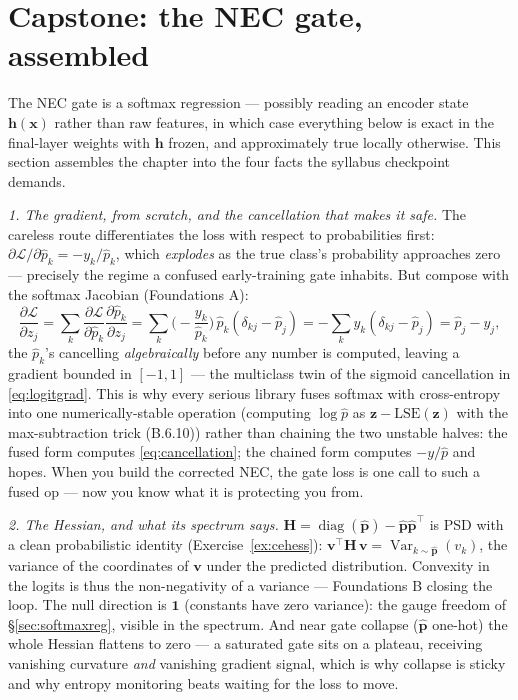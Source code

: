 \documentclass[11pt]{article}
\numberwithin{equation}{section}
\theoremstyle{plain}
\theoremstyle{definition}
\theoremstyle{remark}
\DeclareMathOperator{\Var}{Var}
\DeclareMathOperator{\diag}{diag}
\newcommand{\x}{\bm{x}}
\newcommand{\T}{\top}
\begin{document}
\section{Capstone: the NEC gate, assembled}\label{sec:gate}

The NEC gate is a softmax regression --- possibly reading an encoder state $\bm{h}(\x)$ rather than raw features, in which case everything below is exact in the final-layer weights with $\bm{h}$ frozen, and approximately true locally otherwise. This section assembles the chapter into the four facts the syllabus checkpoint demands.

\emph{1. The gradient, from scratch, and the cancellation that makes it safe.} The careless route differentiates the loss with respect to probabilities first: $\partial \mathcal{L} / \partial \hat p_k = -y_k / \hat p_k$, which \emph{explodes} as the true class's probability approaches zero --- precisely the regime a confused early-training gate inhabits. But compose with the softmax Jacobian (Foundations A):
\begin{equation}
\frac{\partial \mathcal{L}}{\partial z_j}
= \sum_k \frac{\partial \mathcal{L}}{\partial \hat p_k} \frac{\partial \hat p_k}{\partial z_j}
= \sum_k \Big(\!-\frac{y_k}{\hat p_k}\Big)\, \hat p_k (\delta_{kj} - \hat p_j)
= -\sum_k y_k (\delta_{kj} - \hat p_j)
= \hat p_j - y_j ,
\label{eq:cancellation}
\end{equation}
the $\hat p_k$'s cancelling \emph{algebraically} before any number is computed, leaving a gradient bounded in $[-1, 1]$ --- the multiclass twin of the sigmoid cancellation in \eqref{eq:logitgrad}. This is why every serious library fuses softmax with cross-entropy into one numerically-stable operation (computing $\log \hat p$ as $\bm{z} - \mathrm{LSE}(\bm z)$ with the max-subtraction trick (B.6.10)) rather than chaining the two unstable halves: the fused form computes \eqref{eq:cancellation}; the chained form computes $-y/\hat p$ and hopes. When you build the corrected NEC, the gate loss is one call to such a fused op --- now you know what it is protecting you from.

\emph{2. The Hessian, and what its spectrum says.} $\bm H = \diag(\hat{\bm p}) - \hat{\bm p}\hat{\bm p}^\T$ is PSD with a clean probabilistic identity (Exercise~\ref{ex:cehess}): $\bm{v}^\T \bm{H}\, \bm{v} = \Var_{k \sim \hat{\bm p}}(v_k)$, the variance of the coordinates of $\bm v$ under the predicted distribution. Convexity in the logits is thus the non-negativity of a variance --- Foundations B closing the loop. The null direction is $\bm{1}$ (constants have zero variance): the gauge freedom of \S\ref{sec:softmaxreg}, visible in the spectrum. And near gate collapse ($\hat{\bm p}$ one-hot) the whole Hessian flattens to zero --- a saturated gate sits on a plateau, receiving vanishing curvature \emph{and} vanishing gradient signal, which is why collapse is sticky and why entropy monitoring beats waiting for the loss to move.
\end{document}

